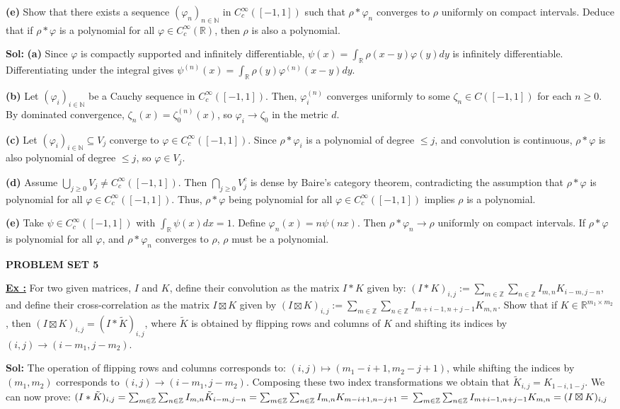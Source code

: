 \documentclass[a4paper,10pt]{article}
\newcommand{\subtitle}[1]{\vspace{0.25cm}\begin{normalsize}\textbf{\textcolor{gray!150}{\uppercase{#1}}}\end{normalsize}}
\newcounter{exerciseCounter}
\newcommand{\exercise}[1]{%
    \vspace{1mm}
    \stepcounter{exerciseCounter}%
    \color{exerciseBlack}
    \textbf{\underline{Ex \theexerciseCounter:}} #1
}
\newcommand{\solution}[1]{%
    {\color{solutionGray} \textbf{Sol: } #1} %
}
\begin{document}
\begin{scriptsize}
{\textbf{(e)} Show that there exists a sequence $(\varphi_n)_{n \in \mathbb{N}}$ in $C_c^\infty([-1,1])$ such that $\rho \ast \varphi_n$ converges to $\rho$ uniformly on compact intervals. Deduce that if $\rho \ast \varphi$ is a polynomial for all $\varphi \in C_c^\infty(\mathbb{R})$, then $\rho$ is also a polynomial.}
\solution{
\textbf{(a)} Since $\varphi$ is compactly supported and infinitely differentiable, $\psi(x) = \int_\mathbb{R} \rho(x-y)\varphi(y)dy$ is infinitely differentiable. Differentiating under the integral gives $\psi^{(n)}(x) = \int_\mathbb{R} \rho(y)\varphi^{(n)}(x-y)dy$.

\textbf{(b)} Let $(\varphi_i)_{i \in \mathbb{N}}$ be a Cauchy sequence in $C_c^\infty([-1,1])$. Then, $\varphi_i^{(n)}$ converges uniformly to some $\zeta_n \in C([-1,1])$ for each $n \geq 0$. By dominated convergence, $\zeta_n(x) = \zeta_0^{(n)}(x)$, so $\varphi_i \to \zeta_0$ in the metric $d$.

\textbf{(c)} Let $(\varphi_i)_{i \in \mathbb{N}} \subseteq V_j$ converge to $\varphi \in C_c^\infty([-1,1])$. Since $\rho \ast \varphi_i$ is a polynomial of degree $\leq j$, and convolution is continuous, $\rho \ast \varphi$ is also polynomial of degree $\leq j$, so $\varphi \in V_j$.

\textbf{(d)} Assume $\bigcup_{j \geq 0} V_j \neq C_c^\infty([-1,1])$. Then $\bigcap_{j \geq 0} V_j^c$ is dense by Baire’s category theorem, contradicting the assumption that $\rho \ast \varphi$ is polynomial for all $\varphi \in C_c^\infty([-1,1])$. Thus, $\rho \ast \varphi$ being polynomial for all $\varphi \in C_c^\infty([-1,1])$ implies $\rho$ is a polynomial.

\textbf{(e)} Take $\psi \in C_c^\infty([-1,1])$ with $\int_\mathbb{R} \psi(x)dx = 1$. Define $\varphi_n(x) = n\psi(nx)$. Then $\rho \ast \varphi_n \to \rho$ uniformly on compact intervals. If $\rho \ast \varphi$ is polynomial for all $\varphi$, and $\rho \ast \varphi_n$ converges to $\rho$, $\rho$ must be a polynomial.}

\subtitle{Problem Set 5}

\exercise{For two given matrices, $I$ and $K$, define their convolution as the matrix $I * K$ given by:
$(I * K)_{i,j} := \sum_{m\in\mathbb{Z}}\sum_{n\in\mathbb{Z}} I_{m,n}K_{i-m,j-n}$,
and define their cross-correlation as the matrix $I \boxtimes K$ given by
$(I \boxtimes K)_{i,j} := \sum_{m\in\mathbb{Z}}\sum_{n\in\mathbb{Z}} I_{m+i-1,n+j-1}K_{m,n}$.
Show that if $K \in \mathbb{R}^{m_1\times m_2}$, then $(I \boxtimes K)_{i,j} = (I * \tilde{K})_{i,j}$, where $\tilde{K}$ is obtained by flipping rows and columns of $K$ and shifting its indices by $(i,j) \to (i-m_1,j-m_2)$.}
\solution{The operation of flipping rows and columns corresponds to:
$(i,j) \mapsto (m_1-i+1,m_2-j+1)$,
while shifting the indices by $(m_1,m_2)$ corresponds to
$(i,j) \to (i-m_1,j-m_2)$.
Composing these two index transformations we obtain that $\tilde{K}_{i,j} = K_{1-i,1-j}$. We can now prove:
$(I * \tilde{K})_{i,j} = \sum_{m\in\mathbb{Z}}\sum_{n\in\mathbb{Z}} I_{m,n}\tilde{K}_{i-m,j-n} = \sum_{m\in\mathbb{Z}}\sum_{n\in\mathbb{Z}} I_{m,n}K_{m-i+1,n-j+1} = \\ \sum_{m\in\mathbb{Z}}\sum_{n\in\mathbb{Z}} I_{m+i-1,n+j-1}K_{m,n} = (I \boxtimes K)_{i,j}$}


\end{scriptsize}
\end{document}
